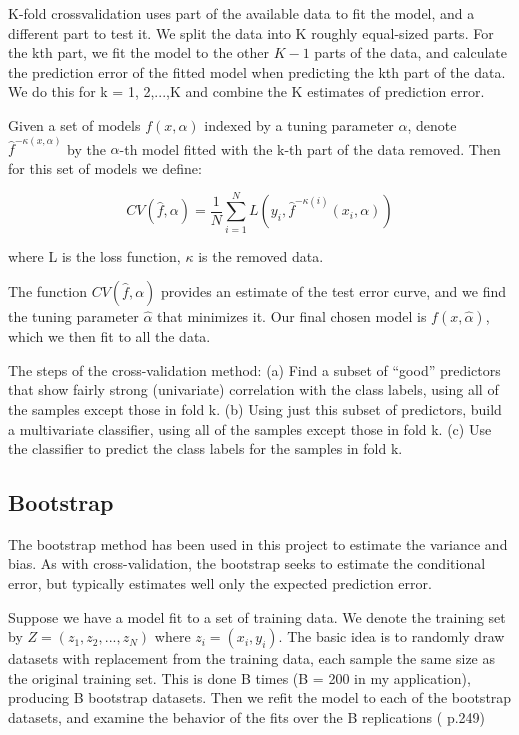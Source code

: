 K-fold crossvalidation uses part of the available data to fit the model, and a different part to test it. We split the data into K roughly equal-sized parts. For the kth part, we fit the model to the other $K-1$ parts of the data, and calculate the prediction error of the fitted model when predicting the kth part of the data. We do this for k = 1, 2,...,K and
combine the K estimates of prediction error.


Given a set of models $f(x,\alpha)$ indexed by a tuning parameter $\alpha$, denote 
$\hat{f}^{-\kappa(x,\alpha)}$ by the $\alpha$-th model fitted with the k-th part of the data removed. Then for this set of models we define:

\begin{equation}
CV(\hat{f},\alpha) = \frac{1}{N}\sum_{i=1}^{N}L(y_i,\hat{f}^{-\kappa(i)}(x_i,\alpha))
\end{equation}
\medskip

where L is the loss function, $\kappa$ is the removed data.

The function $CV(\hat{f},\alpha)$ provides an estimate of the test error curve, and we
find the tuning parameter $\hat{\alpha}$ that minimizes it. Our final chosen model is
$f(x,\hat{\alpha})$, which we then fit to all the data.
\medskip
\medskip

The steps of the cross-validation method: \newline
(a) Find a subset of “good” predictors that show fairly strong (univariate) correlation with the class labels, using all of the samples except those in fold k.\newline
(b) Using just this subset of predictors, build a multivariate classifier, using all of the samples except those in fold k.\newline
(c) Use the classifier to predict the class labels for the samples in
fold k.

\subsection{Bootstrap}

The bootstrap method has been used in this project to estimate the variance and bias.
As with cross-validation, the bootstrap seeks to estimate the conditional error, but typically estimates well only the expected prediction error.

Suppose we have a model fit to a set of training data. We denote the
training set by $Z = (z_1, z_2,...,z_N )$ where $z_i = (x_i, y_i).$ The basic idea is
to randomly draw datasets with replacement from the training data, each
sample the same size as the original training set. This is done B times
(B = 200 in my application), producing B bootstrap datasets.
Then we refit the model to each of the bootstrap datasets, and examine
the behavior of the fits over the B replications (\cite{elementsstat} p.249)




